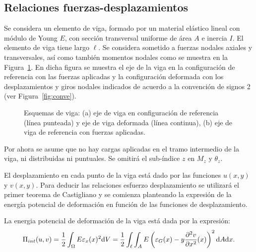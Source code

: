 \subsection{Relaciones fuerzas-desplazamientos}\label{sec:mdvig}

Se considera un elemento de viga, formado por un material elástico lineal con módulo de Young $E$, con sección transversal uniforme de área $A$ e inercia $I$. El elemento de viga tiene largo $\ell$. %
%
Se considera sometido a fuerzas nodales axiales y transversales, así como también momentos nodales como se muestra en la Figura~\ref{fig:ejeviga}. %
%
En dicha figura se muestra el eje de la viga en la configuración de referencia con las fuerzas aplicadas y la configuración deformada con los desplazamientos y giros nodales indicados de acuerdo a la convención de signos 2 (ver Figura~\ref{fig:conve}). %
%
\begin{figure}[htb]
	\setlength{\unitlength}{0.8\textwidth}
	\centering
	\def\svgwidth{0.8\textwidth}
	
	\caption{Esquemas de viga: (a) eje de viga en configuración de referencia (línea punteada) y eje de viga deformada (línea continua), (b) eje de viga de referencia con fuerzas aplicadas.}
	\label{fig:ejeviga}
\end{figure}

Por ahora se asume que no hay cargas aplicadas en el tramo intermedio de la viga, ni distribuidas ni puntuales. %
%
Se omitirá el sub-índice $z$ en $M_z$ y $\theta_z$. 

El desplazamiento en cada punto de la viga está dado por las funciones $u(x,y)$ y $v(x,y)$. %
Para deducir las relaciones esfuerzo desplazamiento se utilizará el primer teorema de Castigliano y se comienza planteando la expresión de la energía potencial de deformación en función de las funciones de desplazamiento. %

La energia potencial de deformación de la viga está dada por la expresión:
%
\begin{equation}
	\Pi_{int}(u,v) = \frac{1}{2} \int_{\Omega} E \varepsilon_x (x)^2 {\text{d}} V = \frac{1}{2} \int_{\ell} \int_{A} E \left( \varepsilon_G(x) -y \frac{\partial ^2 v}{\partial x^2}(x) \right)^2 {\text{d}} A {\text{d}} x .
\end{equation}

